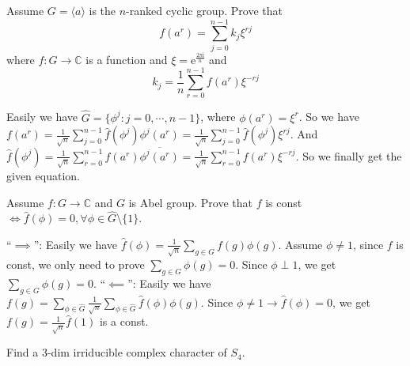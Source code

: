 \documentclass{ctexart}
\newif\ifpreface
\begin{document}
\large
\setlength{\baselineskip}{1.2em}
\ifpreface
    
\newgeometry{left=2cm,right=2cm,top=2cm,bottom=2cm}
\else
{}
\maketitle
\fi
\begin{problem}
  Assume \(G=\langle  a\rangle \) is the \(n\)-ranked cyclic group. Prove that 
  \[
    f(a^r)=\sum_{j=0}^{n-1}k_j \xi^{rj}
  \]
  where \(f:G \to \mathbb{C}\) is a function and \(\xi=\mathrm{e}^{\frac{2\pi \mathrm{i}}{n}}\) and 
  \[
    k_j=\frac{1}{n} \sum_{r=0}^{n-1}f( a^r)\xi^{-rj}
  \]
\end{problem}

\begin{solution}
  Easily we have \(\hat{G} = \{ \phi^j:j=0,\cdots,n-1\}\), where \(\phi( a^r)=\xi^r\). 
  So we have \(f( a^r)=\frac{1}{\sqrt{n}}\sum_{j=0}^{n-1}\hat{f}( \phi^j) \phi^j( a^r)=\frac{1}{\sqrt{n}}\sum_{j=0}^{n-1}\hat{f}( \phi^j) \xi^{rj}\). 
  And \(\hat{f}( \phi^j)=\frac{1}{\sqrt{n}}\sum_{r=0}^{n-1}f( a^r)\overline{\phi^j( a^r)}=\frac{1}{\sqrt{n}}\sum_{r=0}^{n-1}f( a^r)\xi^{-rj}\). 
  So we finally get the given equation. 
\end{solution}

\begin{problem}
  Assume \(f:G \to \mathbb{C}\) and \(G\) is Abel group. Prove that \(f\) is const \(\iff \hat{f}( \phi)=0,\forall \phi \in \hat{G} \setminus \{ 1\}\). 
\end{problem}

\begin{solution}
  ``\(\implies\)'': Easily we have \(\hat{f}( \phi)=\frac{1}{\sqrt{n}}\sum_{g \in G}f( g)\phi( g)\). 
  Assume \(\phi \neq 1\), since \(f\) is const, we only need to prove \(\sum_{g \in G}\phi( g)=0\). 
  Since \(\phi \perp 1\), we get \(\sum_{g \in G}\phi( g) =0\). 
  ``\(\impliedby\)'': Easily we have \(f( g)=\sum_{\phi \in \hat{G}}\frac{1}{\sqrt{n}}\sum_{\phi \in \hat{G}} \hat{f}( \phi)\phi( g)\). 
  Since \(\phi \neq 1 \to \hat{f}( \phi)=0\), we get \(f( g)=\frac{1}{\sqrt{n}} \hat{f}( 1)\) is a const. 
\end{solution}

\begin{problem}
  Find a \(3\)-dim irriducible complex character of \(S_4\).
\end{problem}
\end{document}
